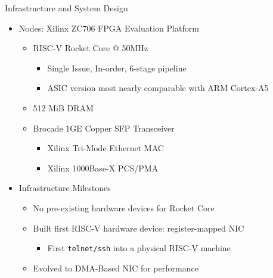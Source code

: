 \begin{block}{Infrastructure and System Design}
    \begin{itemize}
        \item Nodes: Xilinx ZC706 FPGA Evaluation Platform
            \begin{itemize}
                \item RISC-V Rocket Core @ 50MHz
                    \begin{itemize}
                        \item Single Issue, In-order, 6-stage pipeline
                        \item ASIC version most nearly comparable with ARM Cortex-A5
                    \end{itemize}
                \item 512 MiB DRAM
                \item Brocade 1GE Copper SFP Transceiver
                    \begin{itemize}
                        \item Xilinx Tri-Mode Ethernet MAC
                        \item Xilinx 1000Base-X PCS/PMA
                    \end{itemize}

            \end{itemize} 
        \item Infrastructure Milestones
            \begin{itemize}
                \item No pre-existing hardware devices for Rocket Core
                \item Built first RISC-V hardware device: register-mapped NIC
                    \begin{itemize}
                        \item First \texttt{telnet/ssh} into a physical RISC-V machine
                    \end{itemize}
                \item Evolved to DMA-Based NIC for performance
            \end{itemize}
    \end{itemize}


\end{block}
